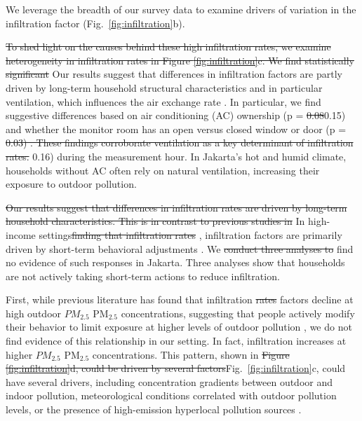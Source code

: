 \documentclass[reqno,12pt,notitlepage]{article}
\providecommand{\DIFadd}[1]{{\protect\color{BLUE}#1}} %
\providecommand{\DIFdel}[1]{{\protect\color{red}\sout{#1}}} %
\providecommand{\DIFaddbegin}{} %
\providecommand{\DIFaddend}{} %
\providecommand{\DIFdelbegin}{} %
\providecommand{\DIFdelend}{} %
\begin{document}
\DIFadd{We leverage the breadth of our survey data to examine drivers of variation in the infiltration factor (Fig.\ }\DIFaddend \ref{fig:infiltration}b). 

\DIFdelbegin \DIFdel{To shed light on the causes behind these high infiltration rates, we examine heterogeneity in infiltration rates in Figure \ref{fig:infiltration}c. We find statistically significant }\DIFdelend \DIFaddbegin \DIFadd{Our results suggest that differences in infiltration factors are partly driven by long-term household structural characteristics and in particular ventilation, which influences the air exchange rate \citep{chen_review_2011}. In particular, we find suggestive }\DIFaddend differences based on air conditioning (AC) ownership (p = \DIFdelbegin \DIFdel{0.08}\DIFdelend \DIFaddbegin \DIFadd{0.15}\DIFaddend ) and whether the monitor room has an open versus closed window or door (p = \DIFdelbegin \DIFdel{0.03) . These findings corroborate ventilation as a key determinant of infiltration rates. }\DIFdelend \DIFaddbegin \DIFadd{0.16) during the measurement hour. }\DIFaddend In Jakarta's hot and humid climate, households without AC often rely on natural ventilation, increasing their exposure to outdoor pollution.

\DIFdelbegin \DIFdel{Our results suggest that differences in infiltration rates are driven by long-term household characteristics. This is in contrast to previous studies in }\DIFdelend \DIFaddbegin \DIFadd{In }\DIFaddend high-income settings\DIFdelbegin \DIFdel{finding that infiltration rates }\DIFdelend \DIFaddbegin \DIFadd{, infiltration factors }\DIFaddend are primarily driven by short-term behavioral adjustments \citep{burke_exposures_2022, baquie_know_2024}. We \DIFdelbegin \DIFdel{conduct three analyses to }\DIFdelend \DIFaddbegin \DIFadd{find no evidence of such responses in Jakarta. Three analyses }\DIFaddend show that households are not actively taking short-term actions to reduce infiltration.

First, while previous literature has found that infiltration \DIFdelbegin \DIFdel{rates }\DIFdelend \DIFaddbegin \DIFadd{factors }\DIFaddend decline at high outdoor \DIFdelbegin \DIFdel{$PM_{2.5}$ }\DIFdelend \DIFaddbegin \DIFadd{PM$_{2.5}$ }\DIFaddend concentrations, suggesting that people actively modify their behavior to limit exposure at higher levels of outdoor pollution \citep{burke_exposures_2022,lunderberg_assessing_2023}, we do not find evidence of this relationship in our setting. In fact, infiltration increases at higher \DIFdelbegin \DIFdel{$PM_{2.5}$ }\DIFdelend \DIFaddbegin \DIFadd{PM$_{2.5}$ }\DIFaddend concentrations. This pattern, shown in \DIFdelbegin \DIFdel{Figure \ref{fig:infiltration}d, could be driven by several factors}\DIFdelend \DIFaddbegin \DIFadd{Fig.\ \ref{fig:infiltration}c, could have several drivers}\DIFaddend , including concentration gradients between outdoor and indoor pollution, meteorological conditions correlated with outdoor pollution levels, or the presence of high-emission hyperlocal pollution sources \citep{lunderberg_assessing_2023,macneill_factors_2012}.
\end{document}
